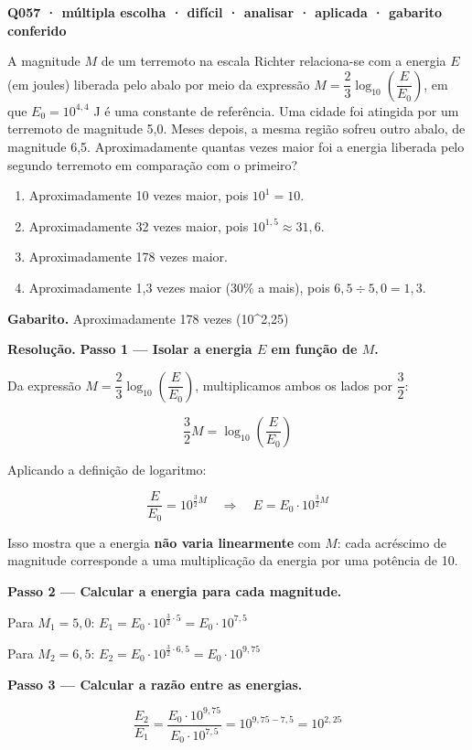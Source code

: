 \documentclass[11pt,a4paper]{article}
\begin{document}
\bigskip\noindent\textbf{Q057 · múltipla escolha · difícil · analisar · aplicada · gabarito conferido}\par\nopagebreak
A magnitude $M$ de um terremoto na escala Richter relaciona-se com a energia $E$ (em joules) liberada pelo abalo por meio da expressão $M = \dfrac{2}{3}\log_{10}\left(\dfrac{E}{E_0}\right)$, em que $E_0 = 10^{4,4}$ J é uma constante de referência. Uma cidade foi atingida por um terremoto de magnitude 5,0. Meses depois, a mesma região sofreu outro abalo, de magnitude 6,5. Aproximadamente quantas vezes maior foi a energia liberada pelo segundo terremoto em comparação com o primeiro?
\begin{enumerate}[label=(\alph*)]
\item Aproximadamente 10 vezes maior, pois $10^{1} = 10$.
\item Aproximadamente 32 vezes maior, pois $10^{1,5} \approx 31{,}6$.
\item Aproximadamente 178 vezes maior.
\item Aproximadamente 1,3 vezes maior (30\% a mais), pois $6{,}5 \div 5{,}0 = 1{,}3$.
\end{enumerate}

\textbf{Gabarito.} Aproximadamente 178 vezes (10\textasciicircum{}2,25)

\textbf{Resolução.} \textbf{Passo 1 — Isolar a energia $E$ em função de $M$.}

Da expressão $M = \dfrac{2}{3}\log_{10}\left(\dfrac{E}{E_0}\right)$, multiplicamos ambos os lados por $\dfrac{3}{2}$:

$$\dfrac{3}{2}M = \log_{10}\left(\dfrac{E}{E_0}\right)$$

Aplicando a definição de logaritmo:

$$\dfrac{E}{E_0} = 10^{\frac{3}{2}M} \quad\Rightarrow\quad E = E_0\cdot 10^{\frac{3}{2}M}$$

Isso mostra que a energia \textbf{não varia linearmente} com $M$: cada acréscimo de magnitude corresponde a uma multiplicação da energia por uma potência de 10.

\textbf{Passo 2 — Calcular a energia para cada magnitude.}

Para $M_1 = 5{,}0$: $E_1 = E_0\cdot 10^{\frac{3}{2}\cdot 5} = E_0\cdot 10^{7{,}5}$

Para $M_2 = 6{,}5$: $E_2 = E_0\cdot 10^{\frac{3}{2}\cdot 6{,}5} = E_0\cdot 10^{9{,}75}$

\textbf{Passo 3 — Calcular a razão entre as energias.}

$$\dfrac{E_2}{E_1} = \dfrac{E_0\cdot 10^{9{,}75}}{E_0\cdot 10^{7{,}5}} = 10^{9{,}75-7{,}5} = 10^{2{,}25}$$
\end{document}
